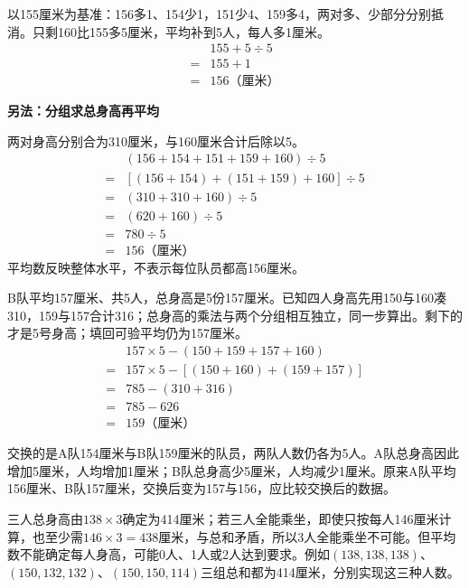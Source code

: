 \documentclass[multi=snippet,border=0pt]{standalone}
\newenvironment{snippet}[3]{\begin{minipage}{#1bp}\color{answerred}\fontsize{#2}{#3}\selectfont\raggedright}{\end{minipage}}
\begin{document}
\begin{snippet}{505}{11.5}{14}以155厘米为基准：156多1、154少1，151少4、159多4，两对多、少部分分别抵消。只剩160比155多5厘米，平均补到5人，每人多1厘米。\[\begin{aligned}&155+5\div5\\={}&155+1\\={}&156\text{（厘米）}\end{aligned}\]\par\textbf{另法：分组求总身高再平均}\par 两对身高分别合为310厘米，与160厘米合计后除以5。\[\begin{aligned}&(156+154+151+159+160)\div5\\={}&[(156+154)+(151+159)+160]\div5\\={}&(310+310+160)\div5\\={}&(620+160)\div5\\={}&780\div5\\={}&156\text{（厘米）}\end{aligned}\]平均数反映整体水平，不表示每位队员都高156厘米。\end{snippet}
\begin{snippet}{505}{11.5}{14}B队平均157厘米、共5人，总身高是5份157厘米。已知四人身高先用150与160凑310，159与157合计316；总身高的乘法与两个分组相互独立，同一步算出。剩下的才是5号身高；填回可验平均仍为157厘米。\[\begin{aligned}&157\times5-(150+159+157+160)\\={}&157\times5-[(150+160)+(159+157)]\\={}&785-(310+316)\\={}&785-626\\={}&159\text{（厘米）}\end{aligned}\]\end{snippet}
\begin{snippet}{505}{11.5}{14}交换的是A队154厘米与B队159厘米的队员，两队人数仍各为5人。A队总身高因此增加5厘米，人均增加1厘米；B队总身高少5厘米，人均减少1厘米。原来A队平均156厘米、B队157厘米，交换后变为157与156，应比较交换后的数据。\end{snippet}
\begin{snippet}{505}{11.5}{14}三人总身高由\(138\times3\)确定为414厘米；若三人全能乘坐，即使只按每人146厘米计算，也至少需\(146\times3=438\)厘米，与总和矛盾，所以3人全能乘坐不可能。但平均数不能确定每人身高，可能0人、1人或2人达到要求。例如\((138,138,138)\)、\((150,132,132)\)、\((150,150,114)\)三组总和都为414厘米，分别实现这三种人数。\end{snippet}
\end{document}
